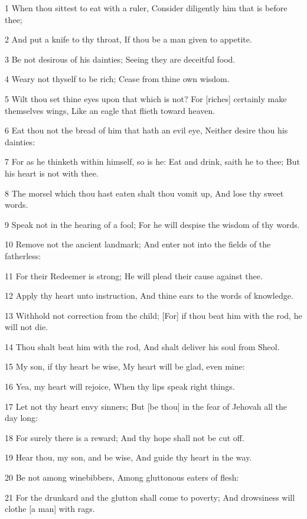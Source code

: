 \par 1 When thou sittest to eat with a ruler, Consider diligently him that is before thee;
\par 2 And put a knife to thy throat, If thou be a man given to appetite.
\par 3 Be not desirous of his dainties; Seeing they are deceitful food.
\par 4 Weary not thyself to be rich; Cease from thine own wisdom.
\par 5 Wilt thou set thine eyes upon that which is not? For [riches] certainly make themselves wings, Like an eagle that flieth toward heaven.
\par 6 Eat thou not the bread of him that hath an evil eye, Neither desire thou his dainties:
\par 7 For as he thinketh within himself, so is he: Eat and drink, saith he to thee; But his heart is not with thee.
\par 8 The morsel which thou hast eaten shalt thou vomit up, And lose thy sweet words.
\par 9 Speak not in the hearing of a fool; For he will despise the wisdom of thy words.
\par 10 Remove not the ancient landmark; And enter not into the fields of the fatherless:
\par 11 For their Redeemer is strong; He will plead their cause against thee.
\par 12 Apply thy heart unto instruction, And thine ears to the words of knowledge.
\par 13 Withhold not correction from the child; [For] if thou beat him with the rod, he will not die.
\par 14 Thou shalt beat him with the rod, And shalt deliver his soul from Sheol.
\par 15 My son, if thy heart be wise, My heart will be glad, even mine:
\par 16 Yea, my heart will rejoice, When thy lips speak right things.
\par 17 Let not thy heart envy sinners; But [be thou] in the fear of Jehovah all the day long:
\par 18 For surely there is a reward; And thy hope shall not be cut off.
\par 19 Hear thou, my son, and be wise, And guide thy heart in the way.
\par 20 Be not among winebibbers, Among gluttonous eaters of flesh:
\par 21 For the drunkard and the glutton shall come to poverty; And drowsiness will clothe [a man] with rags.
